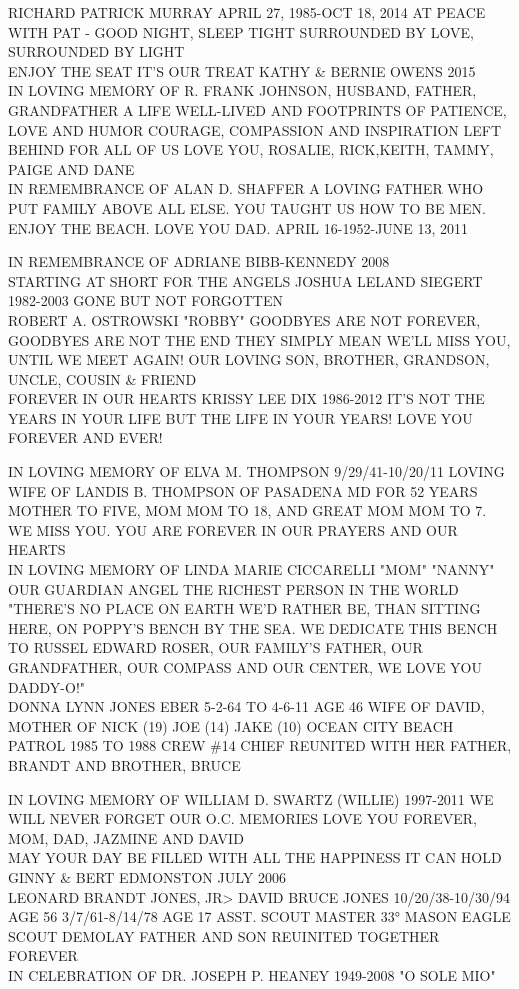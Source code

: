 \documentclass[10pt,letterpaper]{article}
\begin{document}
RICHARD PATRICK MURRAY APRIL 27, 1985{-}OCT 18, 2014 AT PEACE WITH PAT {-} GOOD NIGHT, SLEEP TIGHT SURROUNDED BY LOVE, SURROUNDED BY LIGHT\\
ENJOY THE SEAT IT'S OUR TREAT KATHY \& BERNIE OWENS 2015\\
IN LOVING MEMORY OF R. FRANK JOHNSON, HUSBAND, FATHER, GRANDFATHER A LIFE WELL{-}LIVED AND FOOTPRINTS OF PATIENCE, LOVE AND HUMOR COURAGE, COMPASSION AND INSPIRATION LEFT BEHIND FOR ALL OF US LOVE YOU, ROSALIE, RICK,KEITH, TAMMY, PAIGE AND DANE\\
IN REMEMBRANCE OF ALAN D. SHAFFER A LOVING FATHER WHO PUT FAMILY ABOVE ALL ELSE.  YOU TAUGHT US HOW TO BE MEN. ENJOY THE BEACH.  LOVE YOU DAD. APRIL 16{-}1952{-}JUNE 13, 2011

IN REMEMBRANCE OF ADRIANE BIBB{-}KENNEDY 2008\\
STARTING AT SHORT FOR THE ANGELS JOSHUA LELAND SIEGERT 1982{-}2003 GONE BUT NOT FORGOTTEN\\
ROBERT A. OSTROWSKI "ROBBY" GOODBYES ARE NOT FOREVER, GOODBYES ARE NOT THE END THEY SIMPLY MEAN WE'LL MISS YOU, UNTIL WE MEET AGAIN!  OUR LOVING SON, BROTHER, GRANDSON, UNCLE, COUSIN \& FRIEND\\
FOREVER IN OUR HEARTS KRISSY LEE DIX 1986{-}2012 IT'S NOT THE YEARS IN YOUR LIFE BUT THE LIFE IN YOUR YEARS!  LOVE YOU FOREVER AND EVER!

IN LOVING MEMORY OF ELVA M. THOMPSON 9/29/41{-}10/20/11 LOVING WIFE OF LANDIS B. THOMPSON OF PASADENA MD FOR 52 YEARS MOTHER TO FIVE, MOM MOM TO 18, AND GREAT MOM MOM TO 7.  WE MISS YOU.  YOU ARE FOREVER IN OUR PRAYERS AND OUR HEARTS\\
IN LOVING MEMORY OF LINDA MARIE CICCARELLI "MOM" "NANNY" OUR GUARDIAN ANGEL THE RICHEST PERSON IN THE WORLD\\
"THERE'S NO PLACE ON EARTH WE'D RATHER BE, THAN SITTING HERE, ON POPPY'S BENCH BY THE SEA. WE DEDICATE THIS BENCH TO RUSSEL EDWARD ROSER, OUR FAMILY'S FATHER, OUR GRANDFATHER, OUR COMPASS AND OUR CENTER, WE LOVE YOU DADDY{-}O!"\\
DONNA LYNN JONES EBER 5{-}2{-}64 TO 4{-}6{-}11 AGE 46 WIFE OF DAVID, MOTHER OF NICK (19) JOE (14) JAKE (10) OCEAN CITY BEACH PATROL 1985 TO 1988 CREW \#14 CHIEF REUNITED WITH HER FATHER, BRANDT AND BROTHER, BRUCE

IN LOVING MEMORY OF WILLIAM D. SWARTZ (WILLIE) 1997{-}2011 WE WILL NEVER FORGET OUR O.C. MEMORIES LOVE YOU FOREVER, MOM, DAD, JAZMINE AND DAVID\\
MAY YOUR DAY BE FILLED WITH ALL THE HAPPINESS IT CAN HOLD GINNY \& BERT EDMONSTON JULY 2006\\
LEONARD BRANDT JONES, JR>  DAVID BRUCE JONES 10/20/38{-}10/30/94 AGE 56 3/7/61{-}8/14/78 AGE 17 ASST. SCOUT MASTER 33° MASON EAGLE SCOUT DEMOLAY FATHER AND SON REUINITED TOGETHER FOREVER\\
IN CELEBRATION OF DR. JOSEPH P. HEANEY 1949{-}2008 "O SOLE MIO"
\end{document}
